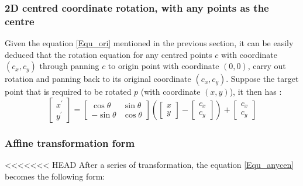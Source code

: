 \subsubsection{2D centred coordinate rotation, with any points as the centre}
Given the equation \ref{Equ_ori} mentioned in the previous section, it can be easily
deduced that the rotation equation for any centred points $c$ with coordinate $(c_{x}, c_{y})$ through
panning $c$ to origin point with coordinate $(0, 0)$, carry out rotation and panning back to its original coordinate $(c_{x}, c_{y})$.
Suppose the target point that is required to be rotated $p$ (with coordinate $(x, y)$), it then has :
\begin{equation} \label{Equ_anycen}
  \begin{bmatrix}
   x^{'} \\ y^{'}
   \end{bmatrix} =   \begin{bmatrix}
      \cos\theta & \sin\theta \\
      -\sin\theta & \cos\theta
    \end{bmatrix} \left(\begin{bmatrix}
      x \\ y
     \end{bmatrix} - \begin{bmatrix}
       c_{x} \\ c_{y}
     \end{bmatrix}\right) + \begin{bmatrix}
        c_{x} \\ c_{y}
       \end{bmatrix}
\end{equation}

\subsubsection{Affine transformation form}
<<<<<<< HEAD
After a series of transformation, the equation \ref{Equ_anycen} becomes the following form:

